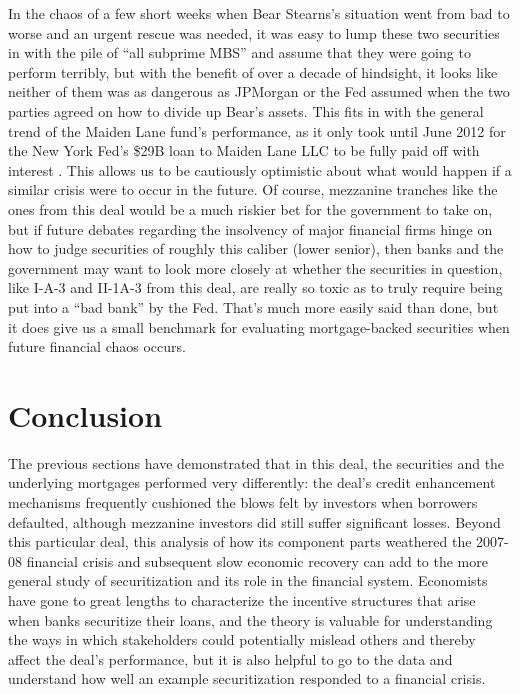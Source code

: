 \documentclass[12pt]{article}
\begin{document}
In the chaos of a few short weeks when Bear Stearns’s situation went from bad to worse and an urgent rescue was needed, it was easy to lump these two securities in with the pile of “all subprime MBS” and assume that they were going to perform terribly, but with the benefit of over a decade of hindsight, it looks like neither of them was as dangerous as JPMorgan or the Fed assumed when the two parties agreed on how to divide up Bear’s assets. This fits in with the general trend of the Maiden Lane fund’s performance, as it only took until June 2012 for the New York Fed’s \$29B loan to Maiden Lane LLC to be fully paid off with interest \parencite{schaefer12}. This allows us to be cautiously optimistic about what would happen if a similar crisis were to occur in the future. Of course, mezzanine tranches like the ones from this deal would be a much riskier bet for the government to take on, but if future debates regarding the insolvency of major financial firms hinge on how to judge securities of roughly this caliber (lower senior), then banks and the government may want to look more closely at whether the securities in question, like I-A-3 and II-1A-3 from this deal, are really so toxic as to truly require being put into a “bad bank” by the Fed. That’s much more easily said than done, but it does give us a small benchmark for evaluating mortgage-backed securities when future financial chaos occurs.


\section*{Conclusion}
The previous sections have demonstrated that in this deal, the securities and the underlying mortgages performed very differently: the deal's credit enhancement mechanisms frequently cushioned the blows felt by investors when borrowers defaulted, although mezzanine investors did still suffer significant losses. Beyond this particular deal, this analysis of how its component parts weathered the 2007-08 financial crisis and subsequent slow economic recovery can add to the more general study of securitization and its role in the financial system. Economists have gone to great lengths to characterize the incentive structures that arise when banks securitize their loans, and the theory is valuable for understanding the ways in which stakeholders could potentially mislead others and thereby affect the deal’s performance, but it is also helpful to go to the data and understand how well an example securitization responded to a financial crisis.
\end{document}

